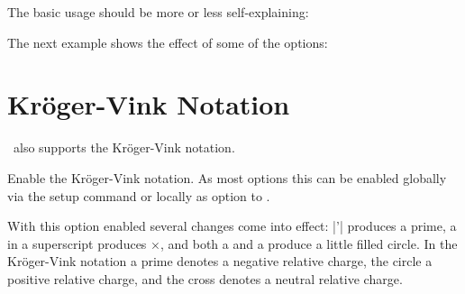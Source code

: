 \documentclass[load-preamble+]{cnltx-doc}
\begin{document}
The basic usage should be more or less self-explaining:
\begin{example}
  \quad
  \quad
\end{example}

The next example shows the effect of some of the options:
\begin{example}
  \quad
  \quad
  \quad
  \quad
\end{example}

\begin{example}
\end{example}

\section{Kröger-Vink Notation}\label{sec:kroger-vink-notation}

\chemformula\ also supports the Kröger-Vink notation.
\begin{options}
    Enable the Kröger-Vink notation. As most options this can be enabled
    globally via the setup command or locally as option to .
\end{options}

With this option enabled several changes come into effect: \verbcode|'|
produces a prime, a  in a superscript produces $\times$, and both a
 and a \code{*} produce a little filled circle. In the Kröger-Vink
notation a prime denotes a negative relative charge, the circle a positive
relative charge, and the cross denotes a neutral relative charge.

\begin{example}[side-by-side,add-sourcecode-options={literate=}]
  \par
  \par
  \par
  \par
  \par
  \par
\end{example}
\end{document}
